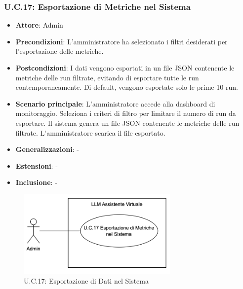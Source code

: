 \subsubsection{U.C.17: Esportazione di Metriche nel Sistema}
\begin{itemize}
    \item \textbf{Attore}: Admin
    \item \textbf{Precondizioni}: L’amministratore ha selezionato i filtri desiderati per l'esportazione delle metriche.
    \item \textbf{Postcondizioni}: I dati vengono esportati in un file JSON contenente le metriche delle run filtrate, 
    evitando di esportare tutte le run contemporaneamente. Di default, vengono esportate solo le prime 10 run.
    \item \textbf{Scenario principale}: L'amministratore accede alla dashboard di monitoraggio. 
    Seleziona i criteri di filtro per limitare il numero di run da esportare. 
    Il sistema genera un file JSON contenente le metriche delle run filtrate. 
    L'amministratore scarica il file esportato.
    \item \textbf{Generalizzazioni}: -
    \item \textbf{Estensioni}: -
    \item \textbf{Inclusione}: -
\end{itemize}
\begin{figure}[H]
    \centering
    \includegraphics[width=0.7\textwidth]{img/UC17.png}
    \caption{U.C.17: Esportazione di Dati nel Sistema}
\end{figure}
\newpage



